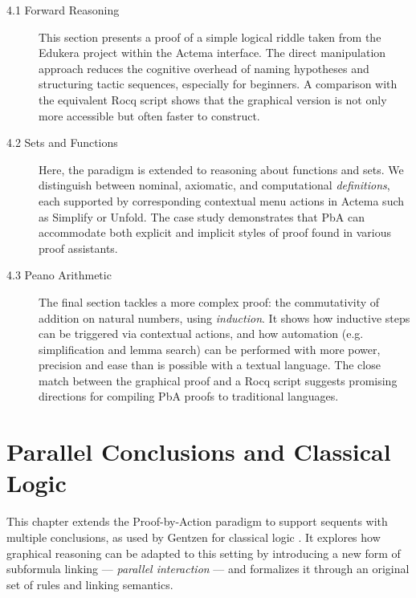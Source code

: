 \documentclass[11pt]{article}
\begin{document}
\begin{description}
\item[4.1 Forward Reasoning]
This section presents a proof of a simple logical riddle taken from the Edukera project \cite{edukera} within the Actema interface. The direct manipulation approach reduces the cognitive overhead of naming hypotheses and structuring tactic sequences, especially for beginners. A comparison with the equivalent Rocq script shows that the graphical version is not only more accessible but often faster to construct.

\item[4.2 Sets and Functions]
Here, the paradigm is extended to reasoning about functions and sets. We distinguish between nominal, axiomatic, and computational \emph{definitions}, each supported by corresponding contextual menu actions in Actema such as \textsf{Simplify} or \textsf{Unfold}. The case study demonstrates that PbA can accommodate both explicit and implicit styles of proof found in various proof assistants.

\item[4.3 Peano Arithmetic]
The final section tackles a more complex proof: the commutativity of addition on natural numbers, using \emph{induction}. It shows how inductive steps can be triggered via contextual actions, and how automation (e.g. simplification and lemma search) can be performed with more power, precision and ease than is possible with a textual language. The close match between the graphical proof and a Rocq script suggests promising directions for compiling PbA proofs to traditional languages.
\end{description}

\section{Parallel Conclusions and Classical Logic}

This chapter extends the Proof-by-Action paradigm to support sequents with multiple conclusions, as used by Gentzen for classical logic \cite{gentzen_untersuchungen_1935}. It explores how graphical reasoning can be adapted to this setting by introducing a new form of subformula linking --- \emph{parallel interaction} --- and formalizes it through an original set of rules and linking semantics.
\end{document}
